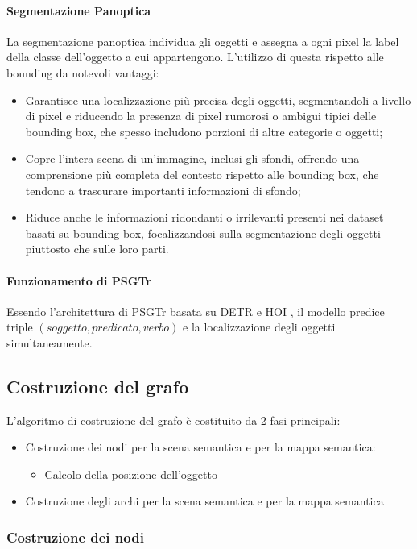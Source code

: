\paragraph*{Segmentazione Panoptica}
La segmentazione panoptica individua gli oggetti e assegna a ogni pixel la label della classe dell'oggetto a cui appartengono. L'utilizzo di questa rispetto alle bounding da notevoli vantaggi:
\begin{itemize}
  \item Garantisce una localizzazione più precisa degli oggetti, segmentandoli a livello di pixel e riducendo la presenza di pixel rumorosi o ambigui tipici delle bounding box, che spesso includono porzioni di altre categorie o oggetti;
  \item Copre l'intera scena di un'immagine, inclusi gli sfondi, offrendo una comprensione più completa del contesto rispetto alle bounding box, che tendono a trascurare importanti informazioni di sfondo;
  \item Riduce anche le informazioni ridondanti o irrilevanti presenti nei dataset basati su bounding box, focalizzandosi sulla segmentazione degli oggetti piuttosto che sulle loro parti.
\end{itemize}
\paragraph*{Funzionamento di PSGTr}
Essendo l'architettura di PSGTr basata su DETR \cite{detr} e HOI \cite{hoi}, il modello predice triple $(soggetto, predicato, verbo)$ e la localizzazione degli oggetti simultaneamente.
\subsection{Costruzione del grafo}
L'algoritmo di costruzione del grafo è costituito da 2 fasi principali:
\begin{itemize}
  \item Costruzione dei nodi per la scena semantica e per la mappa semantica:
  \begin{itemize}
    \item Calcolo della posizione dell'oggetto
  \end{itemize}
  \item Costruzione degli archi per la scena semantica e per la mappa semantica
\end{itemize}

\subsubsection{Costruzione dei nodi}
